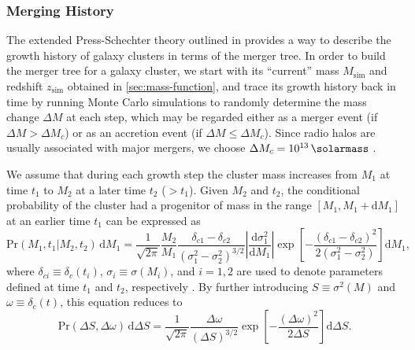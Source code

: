 \documentclass[modern]{aastex62}
\newcommand{\R}[1]{\mathrm{#1}}
\newcommand{\D}[1]{\R{d} #1}
\newcommand{\diff}[2]{\frac{\D{#1}}{\D{#2}}}
\begin{document}
\subsubsection{Merging History}
\label{sec:merging-history}

The extended Press-Schechter theory outlined in \citet{lacey1993} provides
a way to describe the growth history of galaxy clusters in terms of the
merger tree.
In order to build the merger tree for a galaxy cluster, we start with
its \enquote{current} mass $M_{\R{sim}}$ and redshift $z_{\R{sim}}$ obtained
in \autoref{sec:mass-function}, and trace its growth history back in time
by running Monte Carlo simulations to randomly determine the mass change
$\Delta M$ at each step, which may be regarded either as a merger event
(if $\Delta M > \Delta M_c$) or as an accretion event
(if $\Delta M \leq \Delta M_c$).
Since radio halos are usually associated with major mergers, we choose
$\Delta M_c = \SI{e13}{\solarmass}$ \citep[e.g.,][]{cassano2005}.

We assume that during each growth step the cluster mass increases
from $M_1$ at time $t_1$ to $M_2$ at a later time $t_2$ ($> t_1$).
Given $M_2$ and $t_2$, the conditional probability of the cluster had
a progenitor of mass in the range $[M_1, M_1 + \D{M_1}]$ at an earlier
time $t_1$ can be expressed as
\begin{equation}
  \label{eq:eps-condprob}
  \R{Pr}(M_1, t_1 | M_2, t_2) \,\D{M_1} = \frac{1}{\sqrt{2\pi}}
  \frac{M_2}{M_1}
  \frac{\delta_{c1} - \delta_{c2}}{(\sigma_1^2 - \sigma_2^2)^{3/2}}
  \left| \diff{\sigma_1^2}{M_1} \right|
  \exp \!\left[ -\frac{(\delta_{c1} - \delta_{c2})^2}
    {2(\sigma_1^2 - \sigma_2^2)} \right] \D{M_1},
\end{equation}
where
$\delta_{ci} \equiv \delta_c(t_i)$, $\sigma_i \equiv \sigma(M_i)$, and
$i = 1, 2$ are used to denote parameters defined at time $t_1$ and $t_2$,
respectively \citep{lacey1993,randall2002}.
By further introducing $S \equiv \sigma^2(M)$ and
$\omega \equiv \delta_c(t)$, this equation reduces to
\begin{equation}
  \label{eq:eps-condprob-simp}
  \R{Pr}(\Delta S, \Delta \omega) \,\D{\Delta S} = \frac{1}{\sqrt{2\pi}}
  \frac{\Delta\omega}{(\Delta S)^{3/2}}
  \exp \!\left[ -\frac{(\Delta\omega)^2}{2 \Delta S} \right] \D{\Delta S}.
\end{equation}
\end{document}
